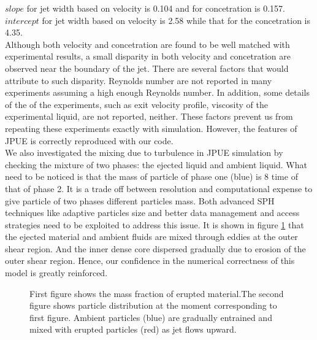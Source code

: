 \documentclass[10pt,a4paper]{article}
\begin{document}
$slope$ for jet width based on velocity is 0.104 and for concetration is 0.157. $intercept$ for jet width based on velocity is 2.58 while that for the concetration is 4.35.\\
Although both velocity and concetration are found to be well matched with experimental results, a small disparity in both velocity and concetration are observed near the boundary of the jet. There are several factors that would attribute to such disparity. Reynolds number are not reported in many experiments assuming a high enough Reynolds number. In addition, some details of the of the experiments, such as exit velocity profile, viscosity of the experimental liquid, are not reported, neither. These factors prevent us from repeating these experiments exactly with simulation. However, the features of JPUE is correctly reproduced with our code.\\
We also investigated the mixing due to turbulence in JPUE simulation by checking the mixture of two phases: the ejected liquid and ambient liquid. What need to be noticed is that the mass of particle of phase one (blue) is 8 time of that of phase 2. It is a trade off between resolution and computational expense to give particle of two phases different particles mass. Both advanced SPH techniques like adaptive particles size and better data management and access strategies need to be exploited to address this issue. It is shown in figure \ref{fig:Turb_mixing} that the ejected material and ambient fluids are mixed through eddies at the outer shear region. And the inner dense core dispersed gradually due to erosion of the outer shear region. Hence, our confidence in the numerical correctness of this model is greatly reinforced.
\begin{figure}
\hfill
{}
\hfill
{}
\hfill
\caption{First figure shows the mass fraction of erupted material.The second figure shows particle distribution at the moment corresponding to first figure. Ambient particles (blue) are gradually entrained and mixed with erupted particles (red) as jet flows upward.}
\label{fig:Turb_mixing}
\end{figure}
\end{document}
